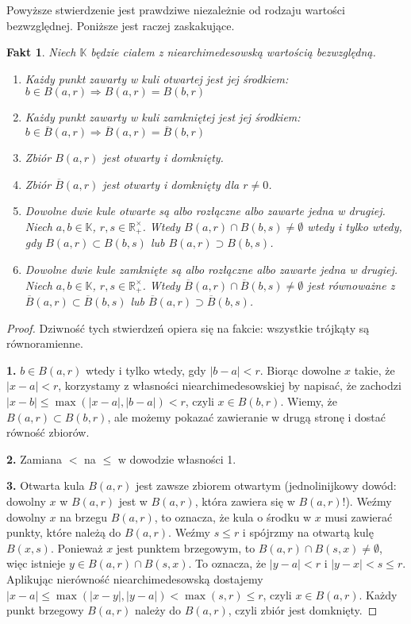 \documentclass[a4paper,fleqn]{article}
\newtheorem{fkt}{Fakt}
\newenvironment{enumx}{\begin{enumerate}
	\setlength{\itemsep}{0pt}
	\setlength{\parskip}{0pt}
	\setlength{\parsep}{0pt}}
{\end{enumerate}}
\begin{document}
\begin{multicols}{2}
Powyższe stwierdzenie jest prawdziwe niezależnie od rodzaju wartości bezwzględnej. Poniższe jest raczej zaskakujące.

\begin{fkt}Niech $\mathbb K$ będzie ciałem z niearchimedesowską wartością bezwzględną.

\begin{enumx}
\item Każdy punkt zawarty w kuli otwartej jest jej środkiem: $b\in B(a,r) \Rightarrow B(a,r) = B(b,r)$
\item Każdy punkt zawarty w kuli zamkniętej jest jej środkiem: $b\in \overline{B}(a,r) \Rightarrow \overline{B}(a,r) = \overline{B}(b,r)$
\item Zbiór $B(a,r)$ jest otwarty i domknięty.
\item Zbiór $\overline{B}(a,r)$ jest otwarty i domknięty dla $r\neq 0$.
\item Dowolne dwie kule otwarte są albo rozłączne albo zawarte jedna w drugiej. Niech $a,b\in\mathbb K$, $r,s\in\mathbb R_+^\times$. Wtedy $B(a,r) \cap B(b,s) \neq \emptyset$ wtedy i tylko wtedy, gdy $B(a,r) \subset B(b,s)$ lub $B(a,r) \supset B(b,s)$.
\item Dowolne dwie kule zamknięte są albo rozłączne albo zawarte jedna w drugiej. Niech $a,b\in\mathbb K$, $r,s\in\mathbb R_+^\times$. Wtedy $\overline{B}(a,r) \cap \overline{B}(b,s) \neq \emptyset$ jest równoważne z $\overline{B}(a,r) \subset \overline{B}(b,s)$ lub $\overline{B}(a,r) \supset \overline{B}(b,s)$.
\end{enumx}\end{fkt}

\begin{proof}
Dziwność tych stwierdzeń opiera się na fakcie: wszystkie trójkąty są równoramienne.

\textbf{1.} $b\in B(a,r)$ wtedy i tylko wtedy, gdy $|b-a| < r$. Biorąc dowolne $x$ takie, że $|x-a| < r$, korzystamy z własności niearchimedesowskiej by napisać, że zachodzi  $|x-b| \le \max (|x-a|, |b-a|) < r$, czyli $x\in B(b,r)$. Wiemy, że $B(a,r) \subset B(b,r)$, ale możemy pokazać zawieranie w drugą stronę i dostać równość zbiorów.

\textbf{2.} Zamiana $<$ na $\le$ w dowodzie własności 1.

\textbf{3.} Otwarta kula $B(a,r)$ jest zawsze zbiorem otwartym (jednolinijkowy dowód: dowolny $x$ w $B(a,r)$ jest w $B(a,r)$, która zawiera się w $B(a,r)$!). Weźmy dowolny $x$ na brzegu $B(a,r)$, to oznacza, że kula o środku w $x$ musi zawierać punkty, które należą do $B(a,r)$. Weźmy $s\le r$ i spójrzmy na otwartą kulę $B(x,s)$. Ponieważ $x$ jest punktem brzegowym, to $B(a,r) \cap B(s,x) \neq \emptyset$, więc istnieje $y\in B(a,r) \cap B(s,x)$. To oznacza, że $|y-a| < r$ i $|y-x| < s \le r$. Aplikując nierówność niearchimedesowską dostajemy $|x-a| \le \max(|x-y|, |y-a|) < \max(s,r) \le r$, czyli $x\in B(a,r)$. Każdy punkt brzegowy $B(a,r)$ należy do $B(a,r)$, czyli zbiór jest domknięty.


\end{proof}
\end{multicols}
\end{document}
